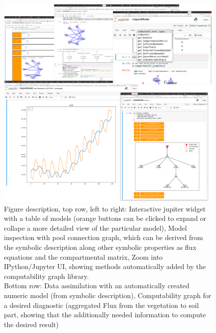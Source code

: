 \begin{figure}[t]
\includegraphics[width=\columnwidth]{TabScreenCombined.pdf}
  \caption{
      Figure description, top row, left to right: Interactive jupiter widget
      with a table of models (orange buttons can be clicked to expand or
      collape a more detailed view of the particular model), Model inspection
      with pool connection graph, which can be derived from the symbolic
      description along other symbolic properties as flux equations and the
      compartmental matrix, Zoom into IPython/Jupyter UI, showing methods
      automatically added by the computability graph library.  \\ Bottom row:
      Data assimilation with an automatically created numeric model (from
      symbolic description), Computability graph for a desired diagnostic
      (aggregated Flux from the vegetation to soil part, showing that the
      additionally needed information to compute the desired result)
  }
\end{figure}

